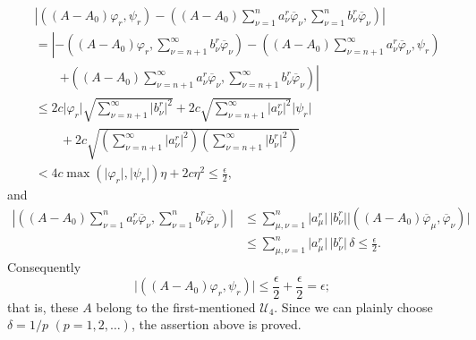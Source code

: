 \documentclass[
  paper=b5,
  twoside=true,
  fontsize=13pt,
  headings=normal,
  bookmarkpackage=false
]{scrartcl}
\theoremstyle{definition}
\begin{document}
\begin{align*}
&\left|
 ((A-A_0)\varphi_r,\psi_r)
 -
 \left(
   (A-A_0)\sum_{\nu=1}^{n}a_\nu^r\overline\varphi_\nu,
   \sum_{\nu=1}^{n}b_\nu^r\overline\varphi_\nu
 \right)
\right|                                                           \\
&=\left|
 -\left(
   (A-A_0)\varphi_r,
   \sum_{\nu=n+1}^{\infty}b_\nu^r\overline\varphi_\nu
 \right)
 -\left(
   (A-A_0)\sum_{\nu=n+1}^{\infty}a_\nu^r\overline\varphi_\nu,
   \psi_r
 \right)\right.                                                   \\
&\qquad\left.
 +\left(
   (A-A_0)\sum_{\nu=n+1}^{\infty}a_\nu^r\overline\varphi_\nu,
   \sum_{\nu=n+1}^{\infty}b_\nu^r\overline\varphi_\nu
 \right)
\right|                                                           \\
&\leq
 2c\lvert\varphi_r\rvert
 \sqrt{\sum_{\nu=n+1}^{\infty}\lvert b_\nu^r\rvert^2}
 +2c
 \sqrt{\sum_{\nu=n+1}^{\infty}\lvert a_\nu^r\rvert^2}
 \lvert\psi_r\rvert                                               \\
&\qquad
 +2c\sqrt{
   \left(\sum_{\nu=n+1}^{\infty}\lvert a_\nu^r\rvert^2\right)
   \left(\sum_{\nu=n+1}^{\infty}\lvert b_\nu^r\rvert^2\right)}\\
&<4c\max(\lvert\varphi_r\rvert,\lvert\psi_r\rvert)\eta+2c\eta^2
 \leq\frac{\epsilon}{2},
\end{align*}
and
\begin{align*}
 \left|
 \left(
   (A-A_0)\sum_{\nu=1}^{n}a_\nu^r\overline\varphi_\nu,
   \sum_{\nu=1}^{n}b_\nu^r\overline\varphi_\nu
 \right)
 \right|
 &\leq
 \sum_{\mu,\nu=1}^{n}
   \lvert a_\mu^r\rvert\,\lvert b_\nu^r\rvert
   \lvert((A-A_0)\overline\varphi_\mu,\overline\varphi_\nu)\rvert \\
 &\leq
 \sum_{\mu,\nu=1}^{n}
   \lvert a_\mu^r\rvert\,\lvert b_\nu^r\rvert\,\delta
 \leq\frac{\epsilon}{2}.
\end{align*}
Consequently
\[
  \lvert((A-A_0)\varphi_r,\psi_r)\rvert
  \leq\frac{\epsilon}{2}+\frac{\epsilon}{2}=\epsilon;
\]
that is, these \(A\) belong to the first-mentioned \(\mathcal U_4\).
Since we can plainly choose \(\delta=1/p\)
\((p=1,2,\ldots)\), the assertion above is proved.
\end{document}
